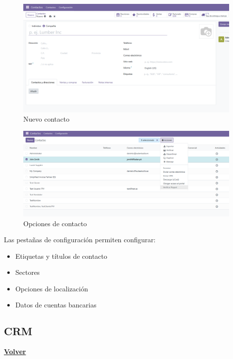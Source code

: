 \documentclass[a4paper,12pt]{article}
\begin{document}
\begin{figure}[h!]
    \centering
    \includegraphics[width=1\textwidth]{pr2odoo64-nuevoContacto.png}
    \caption{Nuevo contacto}
\end{figure}
\FloatBarrier


\begin{figure}[h!]
    \centering
    \includegraphics[width=1\textwidth]{pr2odoo65-opcionesContacto.png}
    \caption{Opciones de contacto}
\end{figure}
\FloatBarrier

Las pestañas de configuración permiten configurar:
\begin{itemize}
    \item Etiquetas y títulos de contacto
    \item Sectores
    \item Opciones de localización
    \item Datos de cuentas bancarias
\end{itemize}

\clearpage

\subsection{CRM}
\hyperlink{anchor-indice}{\textbf{Volver}}\\
\end{document}
